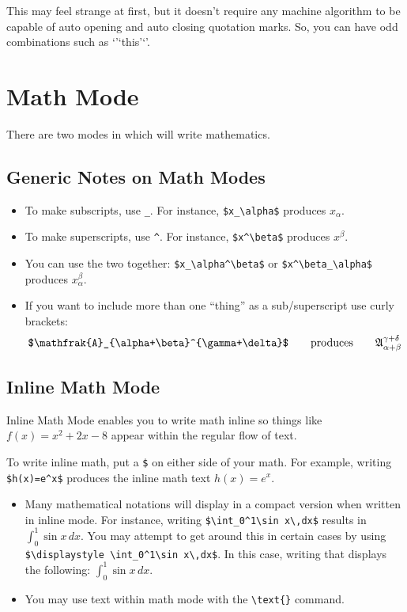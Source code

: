 \documentclass[letterpaper,twoside,10pt]{article}
\begin{document}
\bigbreak This may feel strange at first, but it doesn't require any machine algorithm to be capable
of auto opening and auto closing quotation marks. So, you can have odd combinations such as
`'`this'`'.














\newpage
\section{Math Mode}

There are two modes in which \LaTeXe will write mathematics.

\subsection{Generic Notes on Math Modes}

\begin{itemize}
\item To make subscripts, use \verb!_!. For instance, \verb!$x_\alpha$! produces $x_\alpha$.
\item To make superscripts, use \verb!^!. For instance, \verb!$x^\beta$! produces $x^\beta$.
\item You can use the two together: \verb!$x_\alpha^\beta$! or \verb!$x^\beta_\alpha$! produces $x^\beta_\alpha$.
\item If you want to include more than one ``thing'' as a sub/superscript use curly brackets:
\[
\verb!$\mathfrak{A}_{\alpha+\beta}^{\gamma+\delta}$!\qquad\text{produces}\qquad \displaystyle\mathfrak{A}_{\alpha+\beta}^{\gamma+\delta}
\]

\end{itemize}


\subsection{Inline Math Mode}

Inline Math Mode enables you to write math inline so things like $f(x)=x^2+2x-8$ appear within the
regular flow of text.

\bigbreak To write inline math, put a {\verb!$!} on either side of your math. For example, writing
{\verb!$h(x)=e^x$!} produces the inline math text $h(x)=e^x$.

\begin{itemize}
\item Many mathematical notations will display in a compact version when written in inline mode. For
instance, writing \verb!$\int_0^1\sin x\,dx$! results in $\int_0^1\sin x\,dx$. You may attempt to
get around this in certain cases by using \verb!$\displaystyle \int_0^1\sin x\,dx$!. In this case,
writing that displays the following: $\displaystyle \int_0^1\sin x\,dx$.
\item You may use text within math mode with the \verb!\text{}! command.
\end{itemize}
\end{document}
